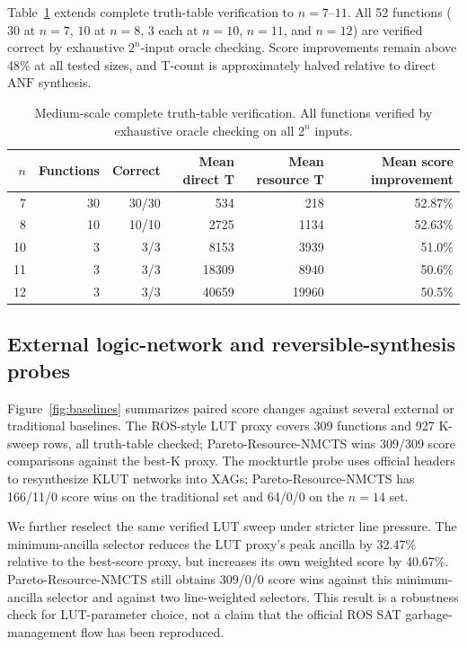 \documentclass[11pt]{article}
\newcommand{\method}{Resource-NMCTS}
\newcommand{\anf}{\ensuremath{\mathrm{ANF}}}
\begin{document}
Table~\ref{tab:medium-scale} extends complete truth-table verification to
$n=7$--$11$.  All 52 functions ($30$ at $n{=}7$, $10$ at $n{=}8$, $3$ each at
$n{=}10$, $n{=}11$, and $n{=}12$) are verified correct by exhaustive $2^n$-input oracle
checking.  Score improvements remain above 48\% at all tested sizes, and
T-count is approximately halved relative to direct \anf{} synthesis.

\begin{table}[H]
\centering
\small
\caption{Medium-scale complete truth-table verification.  All functions
verified by exhaustive oracle checking on all $2^n$ inputs.}
\label{tab:medium-scale}
\begin{tabular}{rrrrrr}
\toprule
$n$ & Functions & Correct & Mean direct T & Mean resource T & Mean score improvement \\
\midrule
7 & 30 & 30/30 & 534 & 218 & 52.87\% \\
8 & 10 & 10/10 & 2725 & 1134 & 52.63\% \\
10 & 3 & 3/3 & 8153 & 3939 & 51.0\% \\
11 & 3 & 3/3 & 18309 & 8940 & 50.6\% \\
12 & 3 & 3/3 & 40659 & 19960 & 50.5\% \\
\bottomrule
\end{tabular}
\end{table}

\subsection{External logic-network and reversible-synthesis probes}

Figure~\ref{fig:baselines} summarizes paired score changes against several
external or traditional baselines.  The ROS-style LUT proxy covers 309
functions and 927 K-sweep rows, all truth-table checked; Pareto-\method{} wins
309/309 score comparisons against the best-K proxy.  The mockturtle probe uses
official headers to resynthesize KLUT networks into XAGs; Pareto-\method{} has
166/11/0 score wins on the traditional set and 64/0/0 on the $n=14$ set.

We further reselect the same verified LUT sweep under stricter line pressure.
The minimum-ancilla selector reduces the LUT proxy's peak ancilla by 32.47\%
relative to the best-score proxy, but increases its own weighted score by
40.67\%.  Pareto-\method{} still obtains 309/0/0 score wins against this
minimum-ancilla selector and against two line-weighted selectors.  This result
is a robustness check for LUT-parameter choice, not a claim that the official
ROS SAT garbage-management flow has been reproduced.
\end{document}
